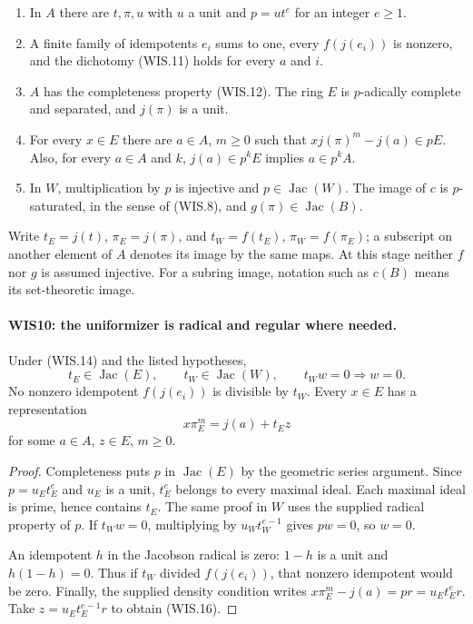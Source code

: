 \begin{enumerate}
\item In $A$ there are $t,\pi,u$ with $u$ a unit and
      $p=ut^e$ for an integer $e\geq1$.
\item A finite family of idempotents $e_i$ sums to one,
      every $f(j(e_i))$ is nonzero, and the dichotomy
      (WIS.11) holds for every $a$ and $i$.
\item $A$ has the completeness property (WIS.12).
      The ring $E$ is $p$-adically complete and separated,
      and $j(\pi)$ is a unit.
\item For every $x\in E$ there are $a\in A$, $m\geq0$ such that
      $xj(\pi)^m-j(a)\in pE$. Also, for every $a\in A$ and $k$,
      $j(a)\in p^kE$ implies $a\in p^kA$.
\item In $W$, multiplication by $p$ is injective and
      $p\in\operatorname{Jac}(W)$. The image of $c$ is
      $p$-saturated, in the sense of (WIS.8), and
      $g(\pi)\in\operatorname{Jac}(B)$.
\end{enumerate}

Write $t_E=j(t)$, $\pi_E=j(\pi)$, and
$t_W=f(t_E)$, $\pi_W=f(\pi_E)$; a subscript on another
element of $A$ denotes its image by the same maps.
At this stage neither $f$ nor $g$ is assumed injective.
For a subring image, notation such as $c(B)$ means its
set-theoretic image.

\paragraph{WIS10: the uniformizer is radical and regular where needed.}
\label{claim:WIS10}
Under (WIS.14) and the listed hypotheses,
\[
 t_E\in\operatorname{Jac}(E),\qquad
 t_W\in\operatorname{Jac}(W),\qquad
 t_Ww=0\Longrightarrow w=0.                                \tag{WIS.15}
\]
No nonzero idempotent $f(j(e_i))$ is divisible by $t_W$.
Every $x\in E$ has a representation
\[
                     x\pi_E^m=j(a)+t_Ez                   \tag{WIS.16}
\]
for some $a\in A$, $z\in E$, $m\geq0$.

\begin{proof}
Completeness puts $p$ in $\operatorname{Jac}(E)$ by the
geometric series argument. Since $p=u_Et_E^e$ and $u_E$
is a unit, $t_E^e$ belongs to every maximal ideal.
Each maximal ideal is prime, hence contains $t_E$.
The same proof in $W$ uses the supplied radical property
of $p$. If $t_Ww=0$, multiplying by $u_Wt_W^{e-1}$
gives $pw=0$, so $w=0$.

An idempotent $h$ in the Jacobson radical is zero:
$1-h$ is a unit and $h(1-h)=0$. Thus if $t_W$ divided
$f(j(e_i))$, that nonzero idempotent would be zero.
Finally, the supplied density condition writes
$x\pi_E^m-j(a)=pr=u_Et_E^er$.
Take $z=u_Et_E^{e-1}r$ to obtain (WIS.16).
\end{proof}

